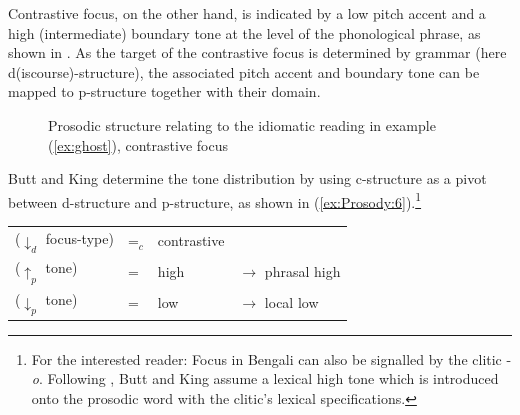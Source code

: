\documentclass[output=paper,hidelinks]{langscibook}
\begin{document}
Contrastive focus, on the other hand, is indicated by a low pitch accent and a high (intermediate) boundary tone at the level of the phonological phrase, as shown in . As the target of the contrastive focus is determined by grammar (here d(iscourse)-structure), the associated pitch accent and boundary tone can be mapped to p-structure together with their domain. %


\begin{figure}
{\small
\begin{center}

\caption{Prosodic structure relating to the idiomatic reading in example (\ref{ex:ghost}), contrastive focus}
\label{fig:idio_contr}
\end{center}
}
\end{figure}

\newpage
Butt and King determine the tone distribution by using c-structure as a pivot between d-structure and p-structure, as shown in (\ref{ex:Prosody:6}).\footnote{For the interested reader: Focus in Bengali can also be signalled by the clitic -{\em o}. Following \citet{LahiriFitzpatrick-Cole1999}, Butt and King assume a lexical high tone which is introduced onto the prosodic word with the clitic's lexical specifications.}

\ea\label{ex:Prosody:6}
\begin{tabular}[t]{llll}
		  ($\downarrow_d$ {\sc focus-type}) &  =$_c$  & {\sc contrastive} & \\
		  ($\uparrow_p$ {\sc tone}) & = & {\sc high} & \hspace{4ex}$\rightarrow$\hspace{2ex} phrasal high\\
		  ($\downarrow_p$ {\sc tone}) & = & {\sc low} &  \hspace{4ex}$\rightarrow$\hspace{2ex} local low\\		  
\end{tabular}
\z
\end{document}
